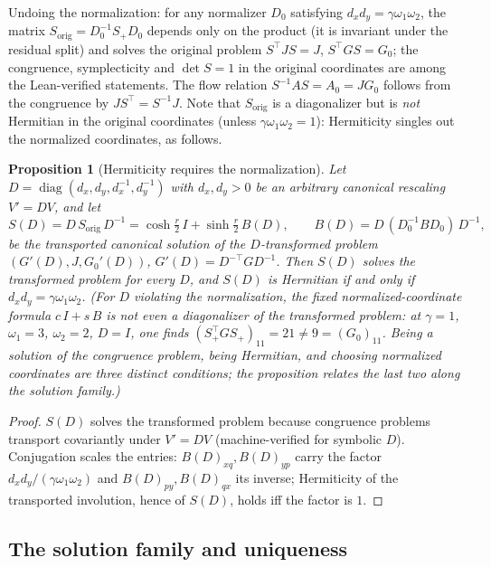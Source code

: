 \documentclass[11pt]{article}
\newtheorem{proposition}[theorem]{Proposition}
\theoremstyle{definition}
\theoremstyle{remark}
\newcommand{\w}{\omega}
\newcommand{\diag}{\operatorname{diag}}
\begin{document}
Undoing the normalization: for any normalizer $D_0$ satisfying
$d_xd_y=\gamma\w_1\w_2$, the matrix
$S_{\mathrm{orig}}=D_0^{-1}S_+D_0$ depends only on the product (it is
invariant under the residual split) and solves the original problem
$S^{\top}JS=J$, $S^{\top}GS=G_0$; the congruence, symplecticity and
$\det S=1$ in the original coordinates are among the Lean-verified
statements.  The flow relation $S^{-1}AS=A_0=JG_0$ follows from the
congruence by $JS^{\top}=S^{-1}J$.  Note that $S_{\mathrm{orig}}$ is a
diagonalizer but is \emph{not} Hermitian in the original coordinates
(unless $\gamma\w_1\w_2=1$): Hermiticity singles out the normalized
coordinates, as follows.

\begin{proposition}[Hermiticity requires the normalization]
\label{prop:hermiticity}
Let $D=\diag(d_x,d_y,d_x^{-1},d_y^{-1})$ with $d_x,d_y>0$ be an arbitrary
canonical rescaling $V'=DV$, and let
\begin{equation}
S(D)=D\,S_{\mathrm{orig}}\,D^{-1}
=\cosh\tfrac r2\,I+\sinh\tfrac r2\,B(D),
\qquad B(D)=D\,(D_0^{-1}BD_0)\,D^{-1},
\end{equation}
be the transported canonical solution of the $D$-transformed problem
$(G'(D),J,G_0'(D))$, $G'(D)=D^{-\top}GD^{-1}$.  Then $S(D)$ solves the
transformed problem for \emph{every} $D$, and $S(D)$ is Hermitian if and
only if $d_xd_y=\gamma\w_1\w_2$.  (For $D$ violating the normalization,
the fixed normalized-coordinate formula $c\,I+s\,B$ is \emph{not even a
diagonalizer} of the transformed problem: at $\gamma=1$, $\w_1=3$,
$\w_2=2$, $D=I$, one finds $(S_+^{\top}GS_+)_{11}=21\neq9=(G_0)_{11}$.
Being a solution of the congruence problem, being Hermitian, and choosing
normalized coordinates are three distinct conditions; the proposition
relates the last two along the solution family.)
\end{proposition}

\begin{proof}
$S(D)$ solves the transformed problem because congruence problems
transport covariantly under $V'=DV$ (machine-verified for symbolic $D$).
Conjugation scales the entries: $B(D)_{xq},B(D)_{yp}$ carry the factor
$d_xd_y/(\gamma\w_1\w_2)$ and $B(D)_{py},B(D)_{qx}$ its inverse;
Hermiticity of the transported involution, hence of $S(D)$, holds iff the
factor is $1$.
\end{proof}

\subsection{The solution family and uniqueness}
\end{document}
